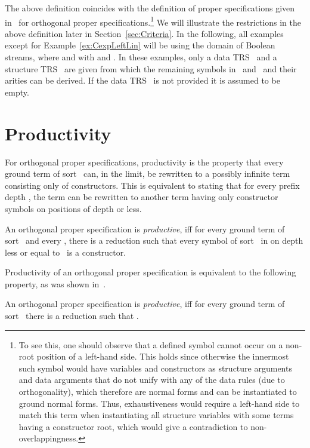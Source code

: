 \documentclass{eptcs}
\begin{document}
The above definition coincides with the definition of proper specifications
given in~\cite{ZR10} for orthogonal proper specifications.\footnote{To see this, one should observe that a defined symbol cannot occur on a non-root
position of a left-hand side. This holds since otherwise the innermost such
symbol would have variables and constructors as structure arguments and data
arguments that do not unify with any of the data rules (due to orthogonality),
which therefore are normal forms and can be instantiated to ground normal forms.
Thus, exhaustiveness would require a left-hand side to match this term when
instantiating all structure variables with some terms having a constructor root,
which would give a contradiction to non-overlappingness.}
We will illustrate the restrictions in the above definition later in
Section~\ref{sec:Criteria}.
In the following, all examples except for Example~\ref{ex:CexpLeftLin}
will be using the domain of Boolean streams,
where  and  with
 and .
In these examples, only a data TRS~ and a structure TRS~ are given
from which the remaining symbols in~ and~ and their arities
can be derived.
If the data TRS~ is not provided it is assumed to be empty.


\section{Productivity}
\label{sec:Productivity}

For orthogonal proper specifications, productivity is the property that
every ground term  of sort~ can, in the limit, be rewritten to a possibly
infinite term consisting only of constructors. This is equivalent to stating
that for every prefix depth , the term  can be rewritten to
another term  having only constructor symbols on positions of depth  or
less.

\begin{definition}
\label{def:OrthoProd}
An orthogonal proper specification  is
\emph{productive},
iff for every ground term  of sort~ and every ,
there is a reduction  such that every
symbol of sort~ in  on depth less or equal to~ is a constructor.
\end{definition}

Productivity of an orthogonal proper specification is equivalent to the
following property, as was shown in~\cite{ZR10}.

\begin{proposition}
\label{prop:OrthoProd}
An orthogonal proper specification  is 
\emph{productive},
iff for every ground term  of sort~ there is a reduction
 such that .
\end{proposition}
\end{document}
